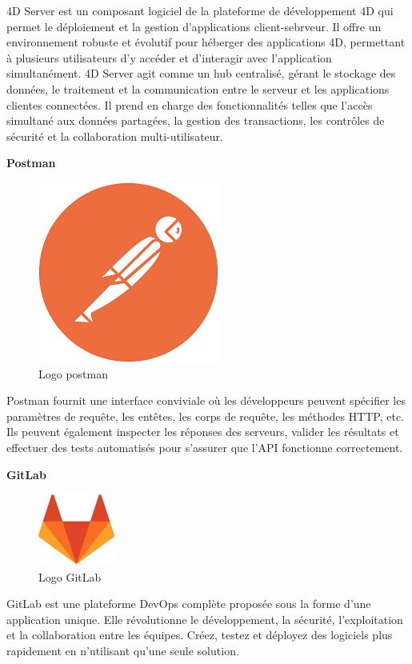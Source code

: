 4D Server est un composant logiciel de la plateforme de développement 4D qui permet le déploiement et la gestion
d’applications client-sebrveur. Il offre un environnement robuste et évolutif pour héberger des applications 4D, 
permettant à plusieurs utilisateurs d’y accéder et d’interagir avec
l’application simultanément. 4D Server agit comme un hub centralisé, 
gérant le stockage des données, le traitement et la communication entre 
le serveur et les applications clientes connectées. Il prend en charge 
des fonctionnalités telles que l’accès simultané aux données partagées, 
la gestion des transactions, les contrôles de sécurité et la collaboration
multi-utilisateur.
\newline


\large 
\textbf{Postman}

\begin{figure}[htbp]
   \centering
   \includegraphics[scale=0.4]{Images/postman.png} 
   \caption{Logo postman}
   \label{fig:4dsrv}
\end{figure}

Postman fournit une interface conviviale où les développeurs 
peuvent spécifier les paramètres de requête, les entêtes, 
les corps de requête, les méthodes HTTP, etc. Ils peuvent 
également inspecter les réponses des serveurs, valider les 
résultats et effectuer des tests automatisés pour s’assurer que 
l’API fonctionne correctement. 
\newline

\large 
\textbf{GitLab}

\begin{figure}[htbp]
   \centering
   \includegraphics[scale=0.6]{Images/gitlab.jpg} 
   \caption{Logo GitLab}
   \label{fig:gitlab}
\end{figure}
GitLab est une plateforme DevOps complète proposée sous la forme 
d’une application unique. Elle révolutionne le développement, 
la sécurité, l’exploitation et la collaboration entre les équipes. 
Créez, testez et déployez des logiciels plus rapidement en 
n’utilisant qu’une seule solution. 


